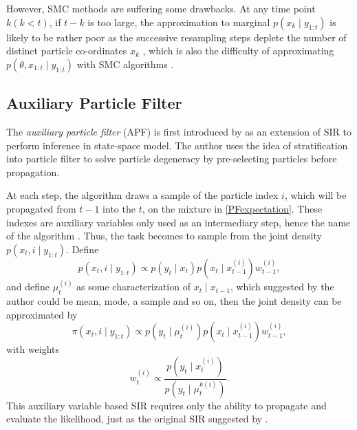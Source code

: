 However, SMC methods are suffering some drawbacks. At any time point $k (k<t)$, if $t-k$ is too large, the approximation to marginal $p(x_k\mid y_{1:t})$ is likely to be rather poor as the successive resampling steps deplete the number of distinct particle co-ordinates $x_k$ \citep{andrieu2010particle}, which is also the difficulty of approximating $p(\theta,x_{1:t}\mid y_{1:t})$ with SMC algorithms 
\citep{andrieu1999sequential, fearnhead2002markov, storvik2002particle}. 




\subsection{Auxiliary Particle Filter}

The \textit{auxiliary particle filter} (APF) is first introduced by \cite{pitt1999filtering} as an extension of SIR to perform inference in state-space model. The author uses the idea of stratification into particle filter to solve particle degeneracy by pre-selecting particles before propagation. 

At each step, the algorithm draws a sample of the particle index $i$, which will be propagated from $t-1$ into the $t$, on the mixture in \eqref{PFexpectation}. These indexes are auxiliary variables only used as an intermediary step, hence the name of the algorithm \citep{pitt1999filtering}. Thus, the task becomes to sample from the joint density $p(x_t,i\mid y_{1:t})$. Define 
\begin{equation}
p(x_t,i\mid y_{1:t})\propto p(y_t\mid x_t)p\left(x_t\mid x_{t-1}^{(i)}\right) w_{t-1}^{(i)}, 
\end{equation}
and define $\mu_t^{(i)}$ as some characterization of $x_t\mid x_{t-1}$, which suggested by the author could be mean, mode, a sample and so on, then the joint density can be approximated by  
\begin{equation}
\pi\left(x_t,i\mid y_{1:t}\right)\propto p\left(y_t\mid \mu_t^{\left(i\right)}\right)p\left(x_t\mid x_{t-1}^{\left(i\right)}\right)w_{t-1}^{\left(i\right)}, 
\end{equation}
with weights
\begin{equation}
w_t^{\left(i\right)}\propto \frac{ p\left(y_t\mid x_t^{\left(i\right)}\right) }{ p\left(y_t\mid\mu_t^{k\left(i\right)}\right) }.
\end{equation}
This auxiliary variable based SIR requires only the ability to propagate and evaluate the likelihood, just as the original SIR suggested by \cite{gordon1993novel}.  

